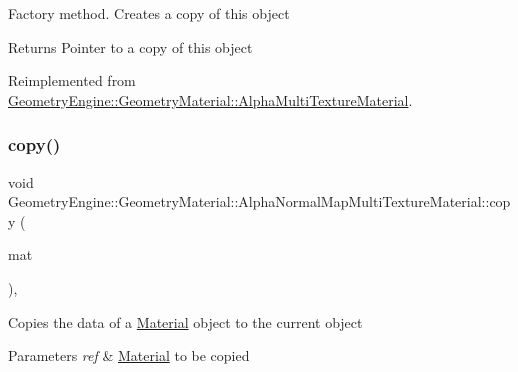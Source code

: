 Factory method. Creates a copy of this object \begin{DoxyReturn}{Returns}
Pointer to a copy of this object 
\end{DoxyReturn}


Reimplemented from \mbox{\hyperlink{class_geometry_engine_1_1_geometry_material_1_1_alpha_multi_texture_material_af31339a285fdf6180fe933f9c2f9ba16}{Geometry\+Engine\+::\+Geometry\+Material\+::\+Alpha\+Multi\+Texture\+Material}}.

\mbox{\label{class_geometry_engine_1_1_geometry_material_1_1_alpha_normal_map_multi_texture_material_a5d221c020a7f96d7fbc8368d5113d06f}} 
\subsubsection{\texorpdfstring{copy()}{copy()}}
{\footnotesize\ttfamily void Geometry\+Engine\+::\+Geometry\+Material\+::\+Alpha\+Normal\+Map\+Multi\+Texture\+Material\+::copy (\begin{DoxyParamCaption}\item[{const \mbox{\hyperlink{class_geometry_engine_1_1_geometry_material_1_1_alpha_normal_map_multi_texture_material}{Alpha\+Normal\+Map\+Multi\+Texture\+Material}} \&}]{mat }\end{DoxyParamCaption})\hspace{0.3cm}{\ttfamily [protected]}, {\ttfamily [virtual]}}

Copies the data of a \mbox{\hyperlink{class_geometry_engine_1_1_geometry_material_1_1_material}{Material}} object to the current object 
\begin{DoxyParams}{Parameters}
{\em ref} & \mbox{\hyperlink{class_geometry_engine_1_1_geometry_material_1_1_material}{Material}} to be copied \\
\hline
\end{DoxyParams}
\mbox{\label{class_geometry_engine_1_1_geometry_material_1_1_alpha_normal_map_multi_texture_material_aeb7a6dd47e712e0d6c85d37e7158a615}} 
